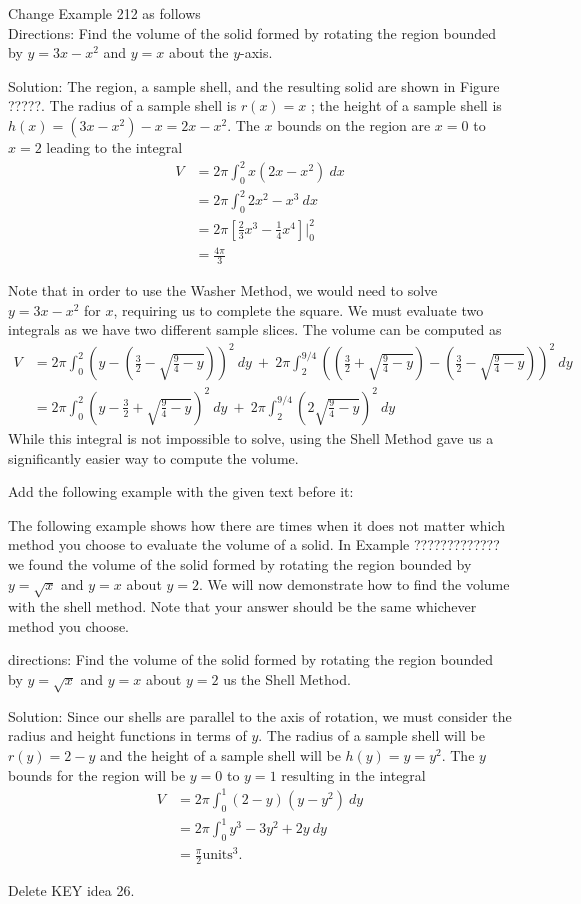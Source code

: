 \documentclass[10pt]{article}
\begin{document}
Change Example 212 as follows \\

Directions:  Find the volume of the solid formed by rotating the region bounded by $y=3x-x^2$ and $y=x$ about the $y$-axis.

Solution:   The region, a sample shell, and the resulting solid are shown in Figure ?????. The radius of a sample shell is $r(x)=x$ ; the height of a sample shell is $h(x)=(3x-x^2)-x=2x-x^2$. The $x$ bounds on the region are $x=0$ to $x=2$ leading to the integral
\begin{align*}
V&=2\pi \int_0^2 x(2x-x^2) ~dx\\
&=2\pi \int_0^2 2x^2-x^3 ~dx\\
&=2\pi \left[ \frac23 x^3-\frac14 x^4 \right] \Big|_0^2\\
&=\frac{4\pi}{3}
\end{align*}

Note that in order to use the Washer Method, we would need to solve $y=3x-x^2$ for $x$, requiring us to complete the square. We must evaluate two integrals as we have two different sample slices. The volume can be computed as 
\begin{align*}
V&=2\pi \int_0^{2} \left(y-\left(\frac32-\sqrt{\frac94 -y}\right)\right)^2~dy \ + \ 2\pi \int_2^{9/4} \left(\left(\frac32+\sqrt{\frac94 -y}\right)-\left(\frac32-\sqrt{\frac94 -y}\right)\right)^2~dy\\
&=2\pi \int_0^2 \left(y-\frac32 +\sqrt{\frac94 -y}\right)^2 ~dy \ + \ 2\pi\int_2^{9/4} \left(2\sqrt{\frac94 -y}\right)^2~dy
\end{align*}
While this integral is not impossible to solve, using the Shell Method gave us a significantly easier way to compute the volume.

Add the following example with the given text before it:

The following example shows how there are times when it does not matter which method you choose to evaluate the volume of a solid. In Example ????????????? we found the volume of the solid formed by rotating the region bounded by $y=\sqrt x$ and $y=x$ about $y=2$.
We will now demonstrate how to find the volume with the shell method. Note that your answer should be the same whichever method you choose.

directions:  Find the volume of the solid formed by rotating the region bounded by $y=\sqrt x$ and $y=x$ about $y=2$ us the Shell Method.

Solution: Since our shells are parallel to the axis of rotation, we must consider the radius and height functions in terms of $y$. The radius of a sample shell will be $r(y)=2-y$ and the height of a sample shell will be $h(y)=y=y^2$. The $y$ bounds for the region will be $y=0$ to $y=1$ resulting in the integral
\begin{align*}
V&=2\pi \int_0^1 (2-y)(y-y^2)~dy\\
&=2\pi\int_0^1 y^3-3y^2+2y~dy\\
&=\frac{\pi}{2} \text{units}^3.
\end{align*}

Delete KEY idea 26.
\end{document}
